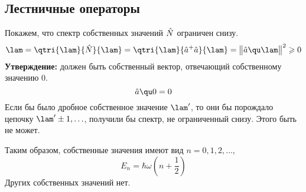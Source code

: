 \subsection{Лестничные операторы}
Покажем, что спектр собственных значений $\Hat N$ ограничен снизу.
$$
    \lam = \qtri{\lam}{\Hat N}{\lam} = \qtri{\lam}{\hat a^+ \hat a}{\lam} = \big\| \hat a \qu \lam  \big\|^2 \geqslant 0
$$
\textbf{Утверждение:} должен быть собственный вектор, отвечающий собственному значению 0.
$$
    \hat a \qu 0 = 0
$$
Если бы было дробное собственное значение $\lam'$, то они бы порождало цепочку $\lam' \pm 1, \ldots$, получили бы спектр, не ограниченный снизу. Этого быть не может.

Таким образом, собственные значения имеют вид $n = 0, 1, 2, \ldots$,
$$
    E_n = \hbar \omega \left( n + \dfrac12 \right)
$$
Других собственных значений нет.

